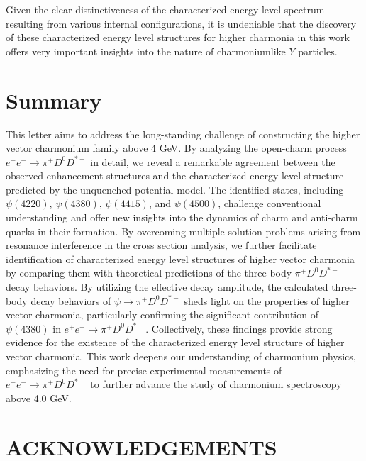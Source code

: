 \documentclass[final,5p,times,twocolumn]{elsarticle}
\begin{document}
Given the clear distinctiveness of the characterized energy level spectrum resulting from various internal configurations, it is undeniable that the discovery  of these characterized energy level structures for higher charmonia in this work offers very important insights into the nature of charmoniumlike $Y$ particles.





\section{Summary} 


This letter aims to address the long-standing challenge of constructing the higher vector charmonium family above 4 GeV. By analyzing the open-charm process $e^+e^-\to \pi^+ D^0 D^{*-}$ in detail, we reveal a remarkable agreement between the observed enhancement structures and the characterized energy level structure predicted by the unquenched potential model. The identified states, including $\psi(4220)$, $\psi(4380)$, $\psi(4415)$, and $\psi(4500)$, challenge conventional understanding and offer new insights into the dynamics of charm and anti-charm quarks in their formation.  By overcoming multiple solution problems arising from resonance interference in the cross section analysis, we further facilitate identification of characterized energy level structures of higher vector charmonia by comparing them with theoretical predictions of the three-body  $\pi^+ D^0 D^{*-}$ decay behaviors. By utilizing the effective decay amplitude, the calculated three-body decay behaviors of $\psi \to \pi^+ D^0 D^{*-}$ sheds light on the properties of higher vector charmonia, particularly confirming the significant contribution of $\psi(4380)$ in $e^+e^- \to\pi^+ D^0 D^{*-}$. Collectively, these findings provide strong evidence for the existence of the characterized energy level structure of higher vector charmonia. This work deepens our understanding of charmonium physics, emphasizing the need for precise experimental measurements of $e^+e^- \to\pi^+ D^0 D^{*-}$ to further advance the study of charmonium spectroscopy above 4.0 GeV.






\section*{ACKNOWLEDGEMENTS}
\end{document}
